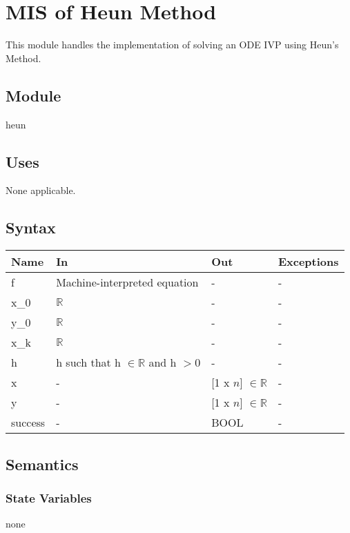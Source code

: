 \documentclass[12pt, titlepage]{article}
\begin{document}
\newpage

\section{MIS of Heun Method} \label{modHeun}
This module handles the implementation of solving an ODE IVP using Heun's Method. 

\subsection{Module}
heun

\subsection{Uses}

None applicable.

\subsection{Syntax}

\begin{center}
\begin{tabular}{p{4cm} p{4cm} p{4cm} p{2cm}}
\hline
\textbf{Name} & \textbf{In} & \textbf{Out} & \textbf{Exceptions} \\
\hline
f & Machine-interpreted equation & - & -\\
x\_0 & $\mathbb{R}$ & - & -\\
y\_0 & $\mathbb{R}$ & - & -\\
x\_k & $\mathbb{R}$ & - & -\\
h & h such that h $\in \mathbb{R}$ and h $> 0$ & - & -\\
x & - & [1 x $n$] $\in \mathbb{R}$ & - \\
y & - & [1 x $n$] $\in \mathbb{R}$ & - \\
success & - & BOOL & - \\
\hline
\end{tabular}
\end{center}

\subsection{Semantics}

\subsubsection{State Variables}
none
\end{document}
